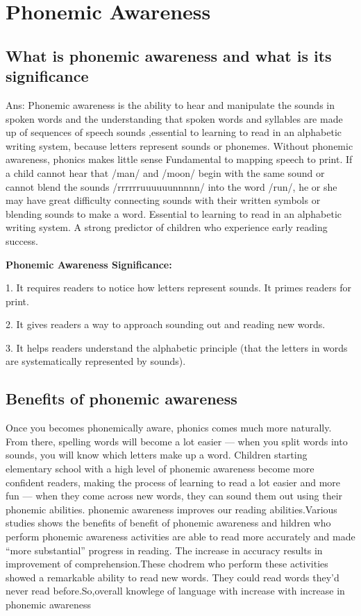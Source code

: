 \section{Phonemic Awareness}

\subsection{What is phonemic awareness and what is its significance}

Ans: Phonemic awareness is the ability to hear and manipulate the sounds
in spoken words and the understanding that spoken words and syllables
are made up of sequences of speech sounds ,essential to learning to read
in an alphabetic writing system, because letters represent sounds or
phonemes. Without phonemic awareness, phonics makes little sense
Fundamental to mapping speech to print. If a child cannot hear that
/man/ and /moon/ begin with the same sound or cannot blend the
sounds /rrrrrruuuuuunnnnn/ into the word /run/, he or she may have
great difficulty connecting sounds with their written symbols or
blending sounds to make a word. Essential to learning to read in an
alphabetic writing system. A strong predictor of children who experience
early reading success.

\textbf{Phonemic Awareness Significance:}

1.  It requires readers to notice how letters represent sounds. It
    primes readers for print.

2.  It gives readers a way to approach sounding out and reading new
    words.

3.  It helps readers understand the alphabetic principle (that the
    letters in words are systematically represented by sounds).

\subsection{Benefits of phonemic awareness}

Once you becomes phonemically aware, phonics comes much more naturally. From there, spelling words will become a lot easier — when you split words into sounds, you will know which letters make up a word.
Children starting elementary school with a high level of phonemic awareness become more confident readers, making the process of learning to read a lot easier and more fun — when they come across new words, they can sound them out using their phonemic abilities.
phonemic awareness improves our reading abilities.Various studies shows the benefits of benefit of phonemic awareness
and  hildren who perform phonemic awareness activities are able to read more accurately and made “more substantial” progress in reading. The increase in accuracy results in improvement of
comprehension.These chodrem who perform these activities showed a remarkable ability to read new words. They could read words they’d never read before.So,overall knowlege of language with increase with increase
in phonemic awareness



